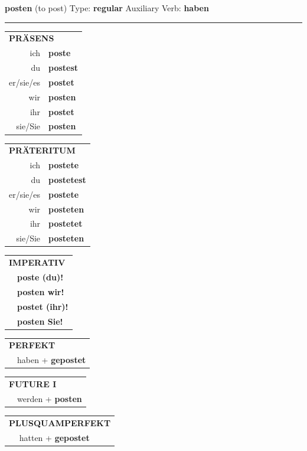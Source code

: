 \documentclass[10pt,a4paper]{revtex4-2}
\begin{document}
\begin{verbbox}
{\Large \bf posten} (to post) \hfill Type: \textbf{regular} \hfill Auxiliary Verb: \textbf{haben} 

\vspace{5pt}
\hrule
\vspace{5pt}

\begin{tabular}{rl}
\multicolumn{2}{l}{\textbf{PRÄSENS}}\\
ich & \textbf{poste}\\
du & \textbf{postest}\\
er/sie/es & \textbf{postet}\\
wir & \textbf{posten}\\
ihr & \textbf{postet}\\
sie/Sie & \textbf{posten}\\
\end{tabular}
\hfill
\begin{tabular}{rl}
\multicolumn{2}{l}{\textbf{PRÄTERITUM}}\\
ich & \textbf{postete}\\
du & \textbf{postetest}\\
er/sie/es & \textbf{postete}\\
wir & \textbf{posteten}\\
ihr & \textbf{postetet}\\
sie/Sie & \textbf{posteten}\\
\end{tabular}
\hfill
\begin{tabular}{rl}
\multicolumn{2}{l}{\textbf{IMPERATIV}}\\
& \textbf{poste (du)!}\\
& \textbf{posten wir!}\\
& \textbf{postet (ihr)!}\\
& \textbf{posten Sie!}\\
\end{tabular}

\vspace{10pt}

\begin{tabular}{rl}
\multicolumn{2}{l}{\textbf{PERFEKT}}\\
& haben + \textbf{gepostet}\\
\end{tabular}
\hfill
\begin{tabular}{rl}
\multicolumn{2}{l}{\textbf{FUTURE I}}\\
& werden + \textbf{posten}\\
\end{tabular}
\hfill
\begin{tabular}{rl}
\multicolumn{2}{l}{\textbf{PLUSQUAMPERFEKT}}\\
& hatten + \textbf{gepostet}\\
\end{tabular}


\end{verbbox}
\end{document}
